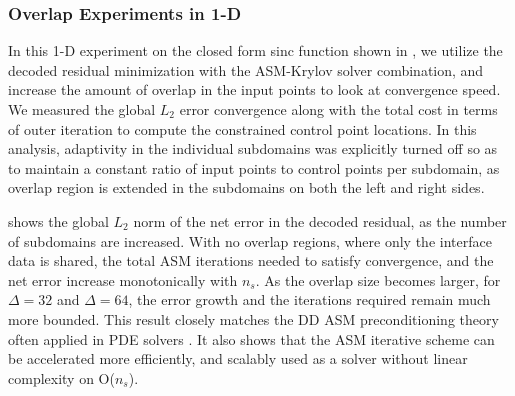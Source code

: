 \subsubsection{Overlap Experiments in 1-D}

In this 1-D experiment on the closed form sinc function shown in , we utilize the decoded residual minimization with the ASM-Krylov solver combination, and increase the amount of overlap in the input points to look at convergence speed. We measured the global $L_2$ error convergence along with the total cost in terms of outer iteration to compute the constrained control point locations. In this analysis, adaptivity in the individual subdomains was explicitly turned off so as to maintain a constant ratio of input points to control points per subdomain, as overlap region is extended in the subdomains on both the left and right sides.

 shows the global $L_2$ norm of the net error in the decoded residual, as the number of subdomains are increased. With no overlap regions, where only the interface data is shared, the total ASM iterations needed to satisfy convergence, and the net error increase monotonically with $n_s$. As the overlap size becomes larger, for $\Delta=32$ and $\Delta=64$, the error growth and the iterations required remain much more bounded. This result closely matches the DD ASM preconditioning theory often applied in PDE solvers \cite{smith-ddm, lions-asm, gander-rasm}. It also shows that the ASM iterative scheme can be accelerated more efficiently, and scalably used as a solver without linear complexity on O($n_s$).

